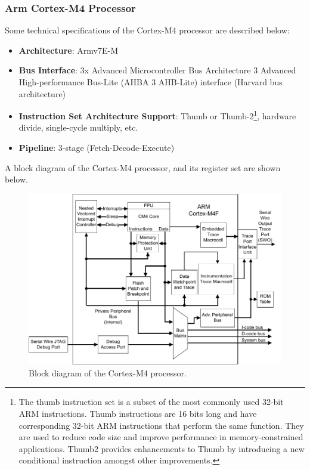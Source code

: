 \documentclass{article}
\begin{document}
\subsubsection{Arm Cortex-M4 Processor}
Some technical specifications of the Cortex-M4 processor are described
below:
\begin{itemize}
    \item \textbf{Architecture}: Armv7E-M
    \item \textbf{Bus Interface}: 3x Advanced Microcontroller Bus Architecture 3 Advanced High-performance Bus-Lite (AHBA 3 AHB-Lite) interface (Harvard bus architecture)
    \item \textbf{Instruction Set Architecture Support}: Thumb or Thumb-2\footnote{The
              thumb instruction set is a subset of the most commonly used 32-bit ARM
              instructions. Thumb instructions are 16 bits long and have
              corresponding 32-bit ARM instructions that perform the same
              function. They are used to reduce code size and improve
              performance in memory-constrained applications. Thumb2 provides
              enhancements to Thumb by introducing a new conditional instruction
              amongst other improvements.}, hardware divide, single-cycle multiply, etc.
    \item \textbf{Pipeline}: 3-stage (Fetch-Decode-Execute)
\end{itemize}
A block diagram of the Cortex-M4 processor, and its register set are
shown below.
\begin{figure}[H]
    \centering
    \includegraphics[width = \linewidth]{figures/cortex_m4_block_diagram.pdf}
    \caption{Block diagram of the Cortex-M4 processor.}
\end{figure}
\end{document}
